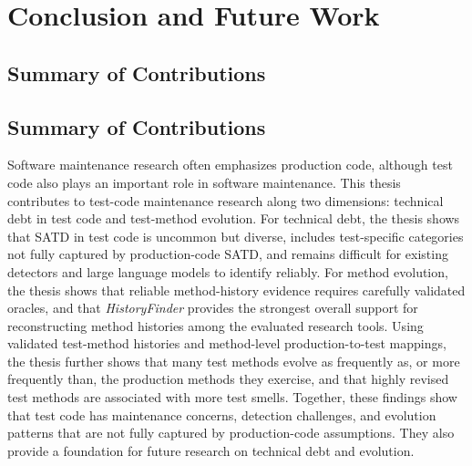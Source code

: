 \chapter{Conclusion and Future Work}
\label{ch:conclusion}

\section{Summary of Contributions}
\section{Summary of Contributions}

Software maintenance research often emphasizes production code, although test code also plays an important role in software maintenance. This thesis contributes to test-code maintenance research along two dimensions: technical debt in test code and test-method evolution. For technical debt, the thesis shows that SATD in test code is uncommon but diverse, includes test-specific categories not fully captured by production-code SATD, and remains difficult for existing detectors and large language models to identify reliably. For method evolution, the thesis shows that reliable method-history evidence requires carefully validated oracles, and that \textit{HistoryFinder} provides the strongest overall support for reconstructing method histories among the evaluated research tools. Using validated test-method histories and method-level production-to-test mappings, the thesis further shows that many test methods evolve as frequently as, or more frequently than, the production methods they exercise, and that highly revised test methods are associated with more test smells. Together, these findings show that test code has maintenance concerns, detection challenges, and evolution patterns that are not fully captured by production-code assumptions. They also provide a foundation for future research on technical debt and evolution.


